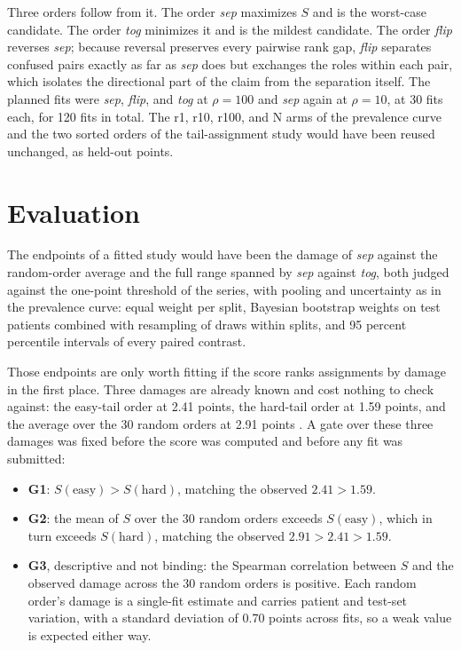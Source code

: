 \documentclass[11pt]{article}
\begin{document}
Three orders follow from it. The order \emph{sep} maximizes $S$ and is the worst-case candidate. The order \emph{tog} minimizes it and is the mildest candidate. The order \emph{flip} reverses \emph{sep}; because reversal preserves every pairwise rank gap, \emph{flip} separates confused pairs exactly as far as \emph{sep} does but exchanges the roles within each pair, which isolates the directional part of the claim from the separation itself. The planned fits were \emph{sep}, \emph{flip}, and \emph{tog} at $\rho=100$ and \emph{sep} again at $\rho=10$, at 30 fits each, for 120 fits in total. The r1, r10, r100, and N arms of the prevalence curve and the two sorted orders of the tail-assignment study would have been reused unchanged, as held-out points.

\section{Evaluation}
\label{sec:evaluation}
The endpoints of a fitted study would have been the damage of \emph{sep} against the random-order average and the full range spanned by \emph{sep} against \emph{tog}, both judged against the one-point threshold of the series, with pooling and uncertainty as in the prevalence curve: equal weight per split, Bayesian bootstrap weights on test patients \citep{rubin1981bayesian} combined with resampling of draws within splits, and 95 percent percentile intervals of every paired contrast.

Those endpoints are only worth fitting if the score ranks assignments by damage in the first place. Three damages are already known and cost nothing to check against: the easy-tail order at 2.41 points, the hard-tail order at 1.59 points, and the average over the 30 random orders at 2.91 points \citep{queisler2026tailTcga, queisler2026prevalenceTcga}. A gate over these three damages was fixed before the score was computed and before any fit was submitted:

\begin{itemize}
  \item \textbf{G1}: $S(\text{easy}) > S(\text{hard})$, matching the observed $2.41 > 1.59$.
  \item \textbf{G2}: the mean of $S$ over the 30 random orders exceeds $S(\text{easy})$, which in turn exceeds $S(\text{hard})$, matching the observed $2.91 > 2.41 > 1.59$.
  \item \textbf{G3}, descriptive and not binding: the Spearman correlation between $S$ and the observed damage across the 30 random orders is positive. Each random order's damage is a single-fit estimate and carries patient and test-set variation, with a standard deviation of 0.70 points across fits, so a weak value is expected either way.
\end{itemize}
\end{document}
